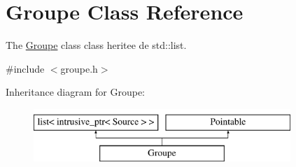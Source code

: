 \hypertarget{classGroupe}{\section{Groupe Class Reference}
\label{classGroupe}
}


The \hyperlink{classGroupe}{Groupe} class class heritee de std\-::list.  




{\ttfamily \#include $<$groupe.\-h$>$}

Inheritance diagram for Groupe\-:\begin{figure}[H]
\begin{center}
\leavevmode
\includegraphics[height=2.000000cm]{classGroupe}
\end{center}
\end{figure}
